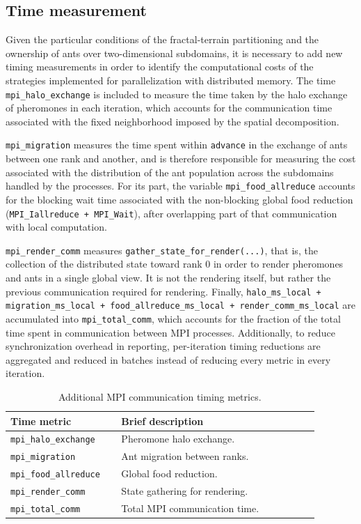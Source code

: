 \subsection{Time measurement}

Given the particular conditions of the fractal-terrain partitioning and the ownership of ants over two-dimensional subdomains, it is necessary to add new timing measurements in order to identify the computational costs of the strategies implemented for parallelization with distributed memory. The time \texttt{mpi\_halo\_exchange} is included to measure the time taken by the halo exchange of pheromones in each iteration, which accounts for the communication time associated with the fixed neighborhood imposed by the spatial decomposition.

\texttt{mpi\_migration} measures the time spent within \texttt{advance} in the exchange of ants between one rank and another, and is therefore responsible for measuring the cost associated with the distribution of the ant population across the subdomains handled by the processes. For its part, the variable \texttt{mpi\_food\_allreduce} accounts for the blocking wait time associated with the non-blocking global food reduction (\texttt{MPI\_Iallreduce + MPI\_Wait}), after overlapping part of that communication with local computation.

\texttt{mpi\_render\_comm} measures \texttt{gather\_state\_for\_render(...)}, that is, the collection of the distributed state toward rank 0 in order to render pheromones and ants in a single global view. It is not the rendering itself, but rather the previous communication required for rendering. Finally, \texttt{halo\_ms\_local + migration\_ms\_local + food\_allreduce\_ms\_local + render\_comm\_ms\_local} are accumulated into \texttt{mpi\_total\_comm}, which accounts for the fraction of the total time spent in communication between MPI processes. Additionally, to reduce synchronization overhead in reporting, per-iteration timing reductions are aggregated and reduced in batches instead of reducing every metric in every iteration.

\begin{table}[htbp]
\centering
\caption{Additional MPI communication timing metrics.}
\label{tab:mpi_timing_summary}
\begin{tabular}{p{0.30\linewidth} p{0.58\linewidth}}
\hline
\textbf{Time metric} & \textbf{Brief description} \\
\hline
\texttt{mpi\_halo\_exchange} & Pheromone halo exchange. \\
\texttt{mpi\_migration} & Ant migration between ranks. \\
\texttt{mpi\_food\_allreduce} & Global food reduction. \\
\texttt{mpi\_render\_comm} & State gathering for rendering. \\
\texttt{mpi\_total\_comm} & Total MPI communication time. \\
\hline
\end{tabular}
\end{table}


